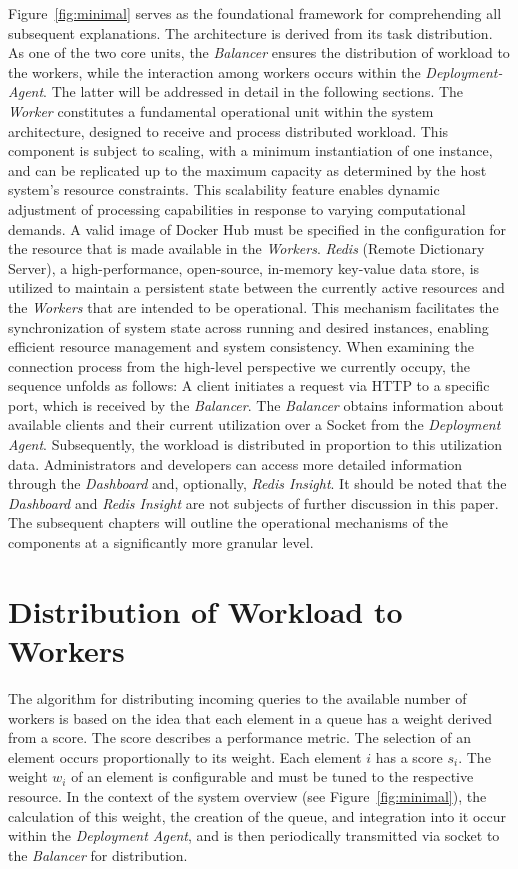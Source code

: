 \documentclass[twocolumn]{webofc}
\begin{document}
Figure~\ref{fig:minimal} serves as the foundational framework for comprehending all subsequent explanations. The architecture is derived from its task distribution. As one of the two core units, the \textit{Balancer} ensures the distribution of workload to the workers, while the interaction among workers occurs within the \textit{Deployment-Agent}. The latter will be addressed in detail in the following sections. The \textit{Worker} constitutes a fundamental operational unit within the system architecture, designed to receive and process distributed workload. This component is subject to scaling, with a minimum instantiation of one instance, and can be replicated up to the maximum capacity as determined by the host system's resource constraints. This scalability feature enables dynamic adjustment of processing capabilities in response to varying computational demands. A valid image of Docker Hub must be specified in the configuration for the resource that is made available in the \textit{Workers}.
\textit{Redis} (Remote Dictionary Server)\cite{redis_docs}, a high-performance, open-source, in-memory key-value data store, is utilized to maintain a persistent state between the currently active resources and the \textit{Workers} that are intended to be operational. This mechanism facilitates the synchronization of system state across running and desired instances, enabling efficient resource management and system consistency. When examining the connection process from the high-level perspective we currently occupy, the sequence unfolds as follows: A client initiates a request via HTTP to a specific port, which is received by the \textit{Balancer}. The \textit{Balancer} obtains information about available clients and their current utilization over a Socket from the \textit{Deployment Agent}. Subsequently, the workload is distributed in proportion to this utilization data.
Administrators and developers can access more detailed information through the \textit{Dashboard} and, optionally, \textit{Redis Insight}. It should be noted that the \textit{Dashboard} and \textit{Redis Insight} are not subjects of further discussion in this paper.
The subsequent chapters will outline the operational mechanisms of the components at a significantly more granular level.

\section{Distribution of Workload to Workers}
The algorithm for distributing incoming queries to the available number of workers is based on the idea that each element in a queue has a weight derived from a score. The score describes a performance metric. The selection of an element occurs proportionally to its weight. Each element \(i\) has a score \(s_i\). The weight \(w_i\) of an element is configurable and must be tuned to the respective resource. In the context of the system overview (see Figure~\ref{fig:minimal}), the calculation of this weight, the creation of the queue, and integration into it occur within the \textit{Deployment Agent}, and is then periodically transmitted via socket to the \textit{Balancer} for distribution.
\end{document}
